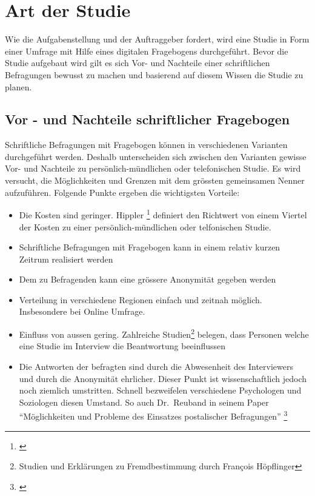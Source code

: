 \section{Art der Studie}\label{art-der-studie}

Wie die Aufgabenstellung und der Auftraggeber fordert, wird eine Studie
in Form einer Umfrage mit Hilfe eines digitalen Fragebogens
durchgeführt. Bevor die Studie aufgebaut wird gilt es sich Vor- und
Nachteile einer schriftlichen Befragungen bewusst zu machen und
basierend auf diesem Wissen die Studie zu planen.

\subsection{Vor - und Nachteile schriftlicher
Fragebogen}\label{vor---und-nachteile-schriftlicher-fragebogen}

Schriftliche Befragungen mit Fragebogen können in verschiedenen
Varianten durchgeführt werden. Deshalb unterscheiden sich zwischen den
Varianten gewisse Vor- und Nachteile zu persönlich-mündlichen oder
telefonischen Studie. Es wird versucht, die Möglichkeiten und Grenzen
mit dem grössten gemeinsamen Nenner aufzuführen. Folgende Punkte ergeben
die wichtigsten Vorteile:

\begin{itemize}
\tightlist
\item
  Die Kosten sind geringer. Hippler \footnote{\autocite{hippler}}
  definiert den Richtwert von einem Viertel der Kosten zu einer
  persönlich-mündlichen oder telfonischen Studie.
\item
  Schriftliche Befragungen mit Fragebogen kann in einem relativ kurzen
  Zeitrum realisiert werden
\item
  Dem zu Befragenden kann eine grössere Anonymität gegeben werden
\item
  Verteilung in verschiedene Regionen einfach und zeitnah möglich.
  Insbesondere bei Online Umfrage.
\item
  Einfluss von aussen gering. Zahlreiche Studien\footnote{Studien und
    Erklärungen zu Fremdbestimmung durch François
    Höpflinger\autocite{umfragemethodik}} belegen, dass Personen welche
  eine Studie im Interview die Beantwortung beeinflussen
\item
  Die Antworten der befragten sind durch die Abwesenheit des
  Interviewers und durch die Anonymität ehrlicher. Dieser Punkt ist
  wissenschaftlich jedoch noch ziemlich umstritten. Schnell bezweifelen
  verschiedene Psychologen und Soziologen diesen Umstand. So auch
  Dr.~Reuband in seinem Paper ``Möglichkeiten und Probleme des Einsatzes
  postalischer Befragungen'' \footnote{\autocite{kzfss01}}
\end{itemize}

